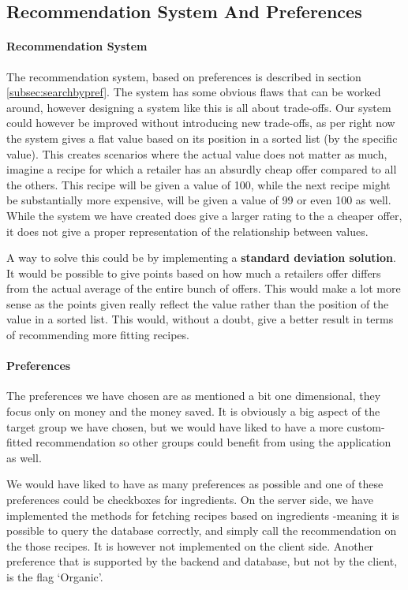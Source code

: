 \subsection{Recommendation System And Preferences}
\label{subsec:recommend}

\paragraph{Recommendation System}
The recommendation system, based on preferences is described in section \ref{subsec:searchbypref}. The system has some obvious flaws that can be worked around, however designing a system like this is all about trade-offs. Our system could however be improved without introducing new trade-offs, as per right now the system gives a flat value based on its position in a sorted list (by the specific value). This creates scenarios where the actual value does not matter as much, imagine a recipe for which a retailer has an absurdly cheap offer compared to all the others. This recipe will be given a value of 100, while the next recipe might be substantially more expensive, will be given a value of 99 or even 100 as well. While the system we have created does give a larger rating to the a cheaper offer, it does not give a proper representation of the relationship between values.

A way to solve this could be by implementing a \textbf{standard deviation solution}. It would be possible to give points based on how much a retailers offer differs from the actual average of the entire bunch of offers. This would make a lot more sense as the points given really reflect the value rather than the position of the value in a sorted list. This would, without a doubt, give a better result in terms of recommending more fitting recipes.

\paragraph{Preferences}
The preferences we have chosen are as mentioned a bit one dimensional, they focus only on money and the money saved. It is obviously a big aspect of the target group we have chosen, but we would have liked to have a more custom-fitted recommendation so other groups could benefit from using the application as well.

We would have liked to have as many preferences as possible and one of these preferences could be checkboxes for ingredients. On the server side, we have implemented the methods for fetching recipes based on ingredients -meaning it is possible to query the database correctly, and simply call the recommendation on the those recipes. It is however not implemented on the client side. Another preference that is supported by the backend and database, but not by the client, is the flag `Organic'. 

